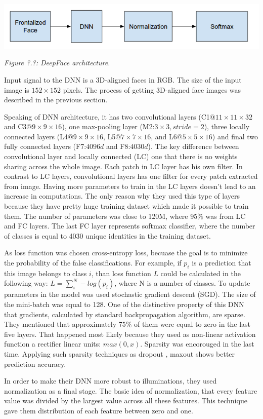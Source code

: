 \documentclass[paper=a4, fontsize=11pt]{scrartcl} %
\numberwithin{equation}{section} %
\numberwithin{figure}{section} %
\numberwithin{table}{section} %
\begin{document}
\begin{center}
\includegraphics[scale=0.5]{pictures/deepface.png}
\par\large\textit{Figure ?.?: DeepFace architecture.}
\end{center}

Input signal to the DNN is a 3D-aligned faces in RGB. The size of the input image is $152 \times 152$ pixels. The process of getting 3D-aligned face images was described in the previous section.\par
Speaking of DNN architecture, it has two convolutional layers (C1$@11\times11\times32$ and C3$@9\times9\times16$), one max-pooling layer (M2:$3\times3, stride=2$), three locally connected layers (L4$@9\times9\times16$, L5$@7\times7\times16$, and L6$@5\times5\times16$) and final two fully connected layers (F7:$4096d$ and F8:$4030d$). The key difference between convolutional layer and locally connected (LC) one that there is no weights sharing across the whole image. Each patch in LC layer has his own filter. In contrast to LC layers, convolutional layers has one filter for every patch extracted from image. Having more parameters to train in the LC layers doesn't lead to an increase in computations. The only reason why they used this type of layers because they have pretty huge training dataset which made it possible to train them. The number of parameters was close to 120M, where 95$\%$ was from LC and FC layers. The last FC layer represents softmax classifier, where the number of classes is equal to 4030 unique identities in the training dataset. \par
As loss function was chosen cross-entropy loss, becuase the goal is to minimize the probability of the false classifications. For example, if $p_i$ is a prediction that this image belongs to class $i$, than loss function $L$ could be calculated in the following way: $L = \sum_i^N-log(p_i)$, where N is a number of classes. To update parameters in the model was used stochastic gradient descent (SGD). The size of the mini-batch was equal to 128. One of the distinctive property of this DNN that gradients, calculated by standard backpropagation algorithm, are sparse. They mentioned that approximately 75$\%$ of them were equal to zero in the last five layers. That happened most likely because they used as non-linear activation function a rectifier linear units: $max(0, x)$. Sparsity was encorouged in the last time. Applying such sparsity techniques as dropout \cite{krizhevsky2012imagenet}, maxout \cite{goodfellow2013maxout} shows better prediction accuracy. \par
In order to make their DNN more robust to illuminations, they used normalization as a final stage. The basic idea of normalization, that every feature value was divided by the largest value across all these features. This technique gave them distribution of each feature between zero and one. 
\end{document}
